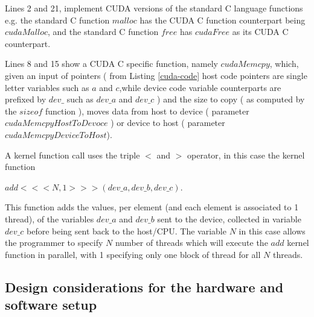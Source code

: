 \documentclass{svmultm}
\begin{document}
Lines 2 and 21, implement CUDA versions of
the standard C language functions e.g. the standard C
function $malloc$ has the CUDA C function counterpart being
$cudaMalloc$, and the standard C function $free$ has $cudaFree$ as its CUDA C counterpart.

Lines 8 and 15 show a CUDA C specific function, namely
$cudaMemcpy$, which, given an input of pointers ( from Listing \ref{cuda-code} host code
pointers are single letter variables such as $a$ and $c$,while
device code variable counterparts are prefixed by $dev\_$ such
as $dev\_a$ and $dev\_c$ ) and the size to copy ( as computed by
the $sizeof$ function ), moves data from host to device
( parameter $cudaMemcpyHostToDevoce$ ) or device to host
( parameter $cudaMemcpyDeviceToHost$).

A kernel function call uses the {triple $<$ and $>$} operator, in
this case the kernel function 

{$add< < < N, 1 > > >$}$( dev\_a, dev\_b,
dev\_c )$.

This function adds the values, per element (and
each element is associated to 1 thread), of the variables
$dev\_a$ and $dev\_b$ sent to the device, collected in variable
$dev\_c$ before being sent back to the host/CPU. The variable
$N$ in this case allows the programmer to specify $N$ number of
threads which will execute the $add$ kernel function in parallel, with 1
specifying only one block of thread for all $N$ threads.

\pagebreak

\subsection{Design considerations for the hardware and software
setup}
\end{document}

